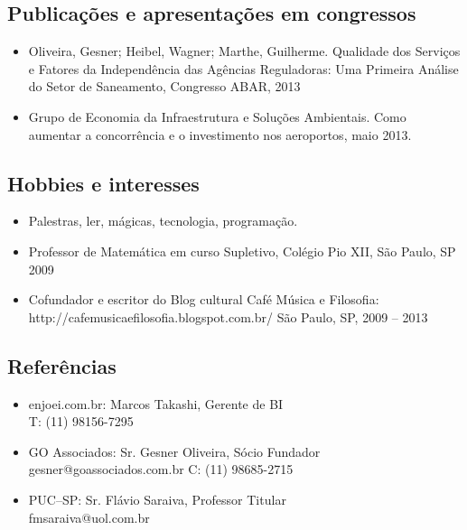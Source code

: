 \documentclass{article}
\begin{document}
\begin{multicols}{2}
\columnbreak

\subsection{Publicações e apresentações em congressos}
\begin{itemize}
\item{Oliveira, Gesner; Heibel, Wagner; Marthe, Guilherme. Qualidade dos Serviços e Fatores da Independência das Agências Reguladoras: Uma Primeira Análise do Setor de Saneamento, Congresso ABAR, 2013} 
\item{Grupo de Economia da Infraestrutura e Soluções Ambientais. Como aumentar a concorrência e o investimento nos aeroportos, maio 2013.}
\end{itemize} 


\subsection{Hobbies e interesses}
\begin{itemize}
\item{Palestras, ler, mágicas, tecnologia, programação.} 
\item{Professor de Matemática em curso Supletivo, Colégio Pio XII, São Paulo, SP 2009} 
\item{Cofundador e escritor do Blog cultural Café Música e Filosofia: http://cafemusicaefilosofia.blogspot.com.br/ São Paulo, SP, 2009 – 2013}
\end{itemize}


\subsection{Referências}
\begin{itemize}
\item{enjoei.com.br: Marcos Takashi, Gerente de BI\\T: (11) 98156-7295} 
\item{GO Associados: Sr. Gesner Oliveira, Sócio Fundador\\gesner@goassociados.com.br C: (11) 98685-2715} 
\item{PUC–SP: Sr. Flávio Saraiva, Professor Titular\\fmsaraiva@uol.com.br}
\end{itemize}

\end{multicols}
\end{document}
